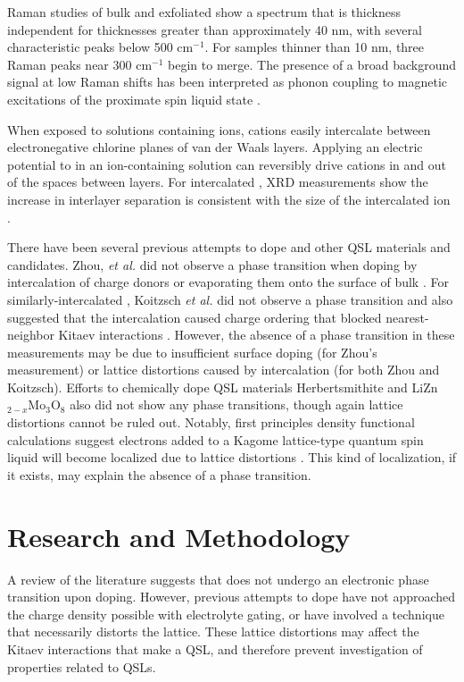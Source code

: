 \documentclass[11pt]{article}
\begin{document}
Raman studies of bulk and exfoliated \rucl show a spectrum that is thickness independent for thicknesses greater than approximately 40 nm, with several characteristic peaks below 500 cm$^{-1}$. For samples thinner than 10 nm, three Raman peaks near 300 cm$^{-1}$ begin to merge. The presence of a broad background signal at low Raman shifts has been interpreted as phonon coupling to magnetic excitations of the proximate spin liquid state \cite{Zhou2018,Du2019}.

When exposed to solutions containing ions, cations easily intercalate between electronegative chlorine planes of \rucl van der Waals layers. Applying an electric potential to \rucl in an ion-containing solution can reversibly drive cations in and out of the spaces between layers. For intercalated \ruclnospace , XRD measurements show the increase in interlayer separation is consistent with the size of the intercalated ion \cite{Steffen1986,Schollhorn1983}.

There have been several previous attempts to dope \rucl and other QSL materials and candidates. Zhou, \textit{et al.} did not observe a phase transition when doping \rucl by intercalation of charge donors or evaporating them onto the surface of bulk \rucl \cite{Zhou2016}. For similarly-intercalated \ruclnospace , Koitzsch \textit{et al.} did not observe a phase transition and also suggested that the intercalation caused charge ordering that blocked nearest-neighbor Kitaev interactions \cite{Koitzsch2017a}. However, the absence of a phase transition in these measurements may be due to insufficient surface doping (for Zhou's measurement) or lattice distortions caused by intercalation (for both Zhou and Koitzsch). Efforts to chemically dope QSL materials Herbertsmithite \cite{Kelly2016} and LiZn$_{2-x}$Mo$_{3}$O$_{8}$ \cite{Sheckelton2015} also did not show any phase transitions, though again lattice distortions cannot be ruled out. Notably, first principles density functional calculations suggest electrons added to a Kagome lattice-type quantum spin liquid will become localized due to lattice distortions \cite{Liu2018}. This kind of localization, if it exists, may explain the absence of a phase transition.


\section{Research and Methodology}

A review of the literature suggests that \rucl does not undergo an electronic phase transition upon doping. However, previous attempts to dope \rucl have not approached the charge density possible with electrolyte gating, or have involved a technique that necessarily distorts the lattice. These lattice distortions may affect the Kitaev interactions that make \rucl a QSL, and therefore prevent investigation of properties related to QSLs.
\end{document}

